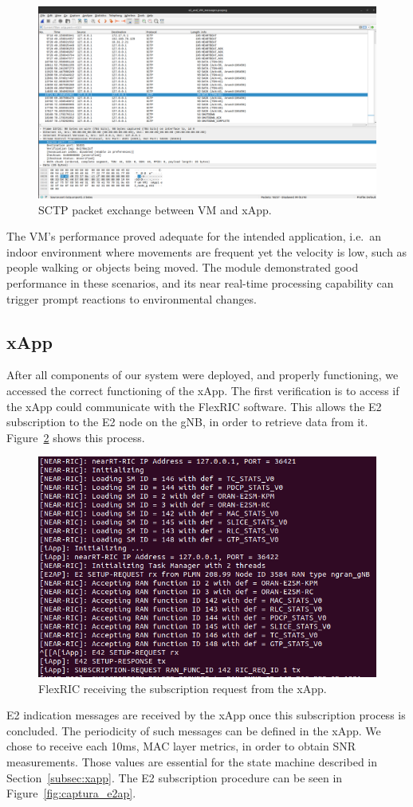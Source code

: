 \begin{figure}[H]
    \centering
    \includegraphics[width=0.5\linewidth]{figures/vm_xapp}
    \caption[SCTP packet exchange between VM and xApp]{SCTP packet exchange between VM and xApp.}
    \label{fig:capture_messages}
\end{figure}

The VM's performance proved adequate for the intended application, i.e.\ an indoor environment where movements are frequent yet the velocity is low, such as people walking or objects being moved.
The module demonstrated good performance in these scenarios, and its near real-time processing capability can trigger prompt reactions to environmental changes.

\subsection{xApp}\label{subsec:mm_xapp}
After all components of our system were deployed, and properly functioning, we accessed the correct functioning of the xApp.
The first verification is to access if the xApp could communicate with the FlexRIC software.
This allows the E2 subscription to the E2 node on the gNB, in order to retrieve data from it.
Figure~\ref{fig:xapp_subscription} shows this process.

\begin{figure}[H]
    \centering
    \includegraphics[width=0.5\linewidth]{figures/xapp_subscription}
    \caption{FlexRIC receiving the subscription request from the xApp.}
    \label{fig:xapp_subscription}
\end{figure}

E2 indication messages are received by the xApp once this subscription process is concluded.
The periodicity of such messages can be defined in the xApp.
We chose to receive each 10ms, MAC layer metrics, in order to obtain SNR measurements.
Those values are essential for the state machine described in Section~\ref{subsec:xapp}.
The E2 subscription procedure can be seen in Figure~\ref{fig:captura_e2ap}.

